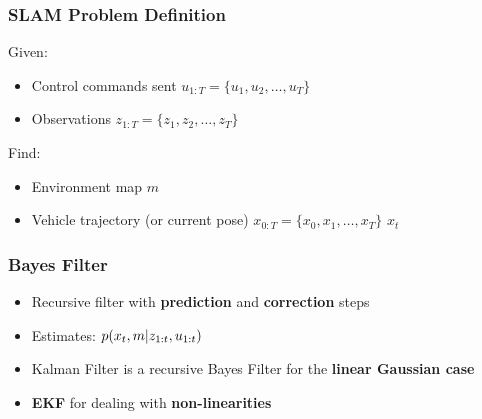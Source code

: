 \begin{frame}
    \frametitle{SLAM Problem Definition}

    Given:
    \begin{itemize}
        \item Control commands sent $u_{1:T} = \{u_1, u_2, \ldots, u_T\}$
        \item Observations $z_{1:T} = \{z_1, z_2, \ldots, z_T\}$
    \end{itemize}

    Find:
    \begin{itemize}
        \item Environment map $m$
        \item Vehicle trajectory (or current pose) $x_{0:T} = \{x_0, x_1, \ldots, x_T\}$ $x_{t}$
    \end{itemize}
\end{frame}

\begin{frame}
    \frametitle{Bayes Filter}

    \begin{itemize}
        \item Recursive filter with \textbf{prediction} and \textbf{correction} steps
        \item Estimates: $p(x_t, m | z_{1:t}, u_{1:t})$
        \item Kalman Filter is a recursive Bayes Filter for the \textbf{linear Gaussian case}
        \item \textbf{EKF} for dealing with \textbf{non-linearities}
    \end{itemize}
\end{frame}

